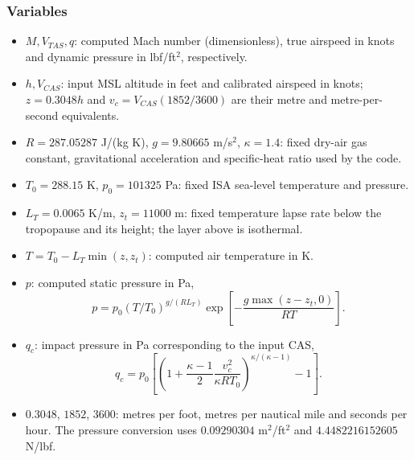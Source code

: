 \documentclass[10pt,a4paper]{amsart}
\begin{document}
\subsubsection*{Variables}
\begin{itemize}
\setlength{\itemsep}{0pt}
\setlength{\parsep}{0pt}
\item $M,V_{TAS},q$: computed Mach number (dimensionless), true airspeed
in knots and dynamic pressure in lbf/ft$^2$, respectively.
\item $h,V_{CAS}$: input MSL altitude in feet and calibrated airspeed in
knots; $z=0.3048h$ and $v_c=V_{CAS}(1852/3600)$ are their metre and
metre-per-second equivalents.
\item $R=287.05287$ J/(kg K), $g=9.80665$ m/s$^2$, $\kappa=1.4$:
fixed dry-air gas constant, gravitational acceleration and specific-heat
ratio used by the code.
\item $T_0=288.15$ K, $p_0=101325$ Pa: fixed ISA sea-level temperature
and pressure.
\item $L_T=0.0065$ K/m, $z_t=11000$ m: fixed temperature lapse rate
below the tropopause and its height; the layer above is isothermal.
\item $T=T_0-L_T\min(z,z_t)$: computed air temperature in K.
\item $p$: computed static pressure in Pa,
\[
 p=p_0(T/T_0)^{g/(RL_T)}
       \exp\!\left[-\frac{g\max(z-z_t,0)}{RT}\right].
\]
\item $q_c$: impact pressure in Pa corresponding to the input CAS,
\[
 q_c=p_0\left[\left(1+\frac{\kappa-1}{2}
              \frac{v_c^2}{\kappa RT_0}\right)^{\kappa/(\kappa-1)}-1\right].
\]
\item $0.3048$, $1852$, $3600$: metres per foot, metres per nautical
mile and seconds per hour. The pressure conversion uses
$0.09290304$ m$^2$/ft$^2$ and $4.4482216152605$ N/lbf.
\end{itemize}
\end{document}
